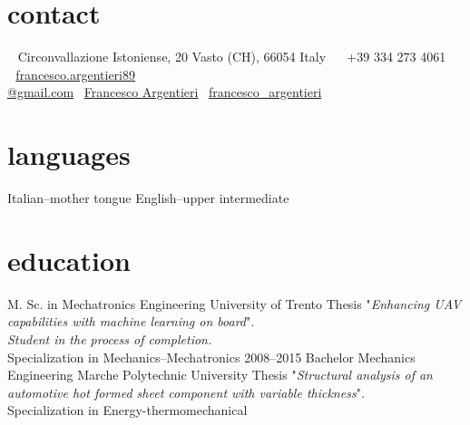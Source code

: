 \documentclass[]{friggeri-cv} %
\newcommand{\LinkedinColour}{{\color{linkedin} \faLinkedin}}
\newcommand{\Email}{{\color{black} \faEnvelope \,}}
\newcommand{\Skype}{{\color{skypeblue} \faSkype}}
\newcommand{\Phone}{{\color{phonegreen} \faPhone}}
\begin{document}


\begin{aside} %
  \section{contact}
  ~
  Circonvallazione Istoniense, 20
  Vasto (CH), 66054
  Italy
  ~
  \Phone \, +39 334 273 4061
  ~
  \Email \, \href{mailto:francesco.argentieri89@gmail.com}{francesco.argentieri89\\@gmail.com}
  \LinkedinColour \, \href{https://it.linkedin.com/in/francesco-argentieri}{Francesco Argentieri}
  \Skype \, \href{skype:my_username?add}{francesco\_argentieri}
  \section{languages}
  Italian--mother tongue
  English--upper intermediate
\end{aside}


\section{education}
  \begin{entrylist}
    {M. Sc. {\normalfont in Mechatronics Engineering}}
    {University of Trento}
    {Thesis "\emph{Enhancing UAV capabilities with machine learning on board}".\\
    \emph{Student in the process of completion.}\\ Specialization in Mechanics--Mechatronics}
    \entry
    {2008--2015}
    {Bachelor {\normalfont Mechanics Engineering}}
    {Marche Polytechnic University}
    {Thesis "\emph{Structural analysis of an automotive hot formed sheet component with variable thickness}".\\
    Specialization in Energy-thermomechanical}
  \end{entrylist}
\end{document}
